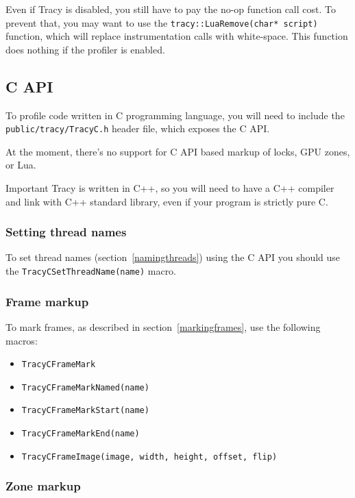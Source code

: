 \documentclass[hidelinks,titlepage,a4paper]{article}
\begin{document}
Even if Tracy is disabled, you still have to pay the no-op function call cost. To prevent that, you may want to use the \texttt{tracy::LuaRemove(char* script)} function, which will replace instrumentation calls with white-space. This function does nothing if the profiler is enabled.

\subsection{C API}
\label{capi}

To profile code written in C programming language, you will need to include the \texttt{public/tracy/TracyC.h} header file, which exposes the C API.

At the moment, there's no support for C API based markup of locks, GPU zones, or Lua.

\begin{bclogo}[
noborder=true,
couleur=black!5,
logo=\bcbombe
]{Important}
Tracy is written in C++, so you will need to have a C++ compiler and link with C++ standard library, even if your program is strictly pure C.
\end{bclogo}

\subsubsection{Setting thread names}

To set thread names (section~\ref{namingthreads}) using the C API you should use the \texttt{TracyCSetThreadName(name)} macro.

\subsubsection{Frame markup}

To mark frames, as described in section~\ref{markingframes}, use the following macros:

\begin{itemize}
\item \texttt{TracyCFrameMark}
\item \texttt{TracyCFrameMarkNamed(name)}
\item \texttt{TracyCFrameMarkStart(name)}
\item \texttt{TracyCFrameMarkEnd(name)}
\item \texttt{TracyCFrameImage(image, width, height, offset, flip)}
\end{itemize}

\subsubsection{Zone markup}
\label{czonemarkup}
\end{document}
